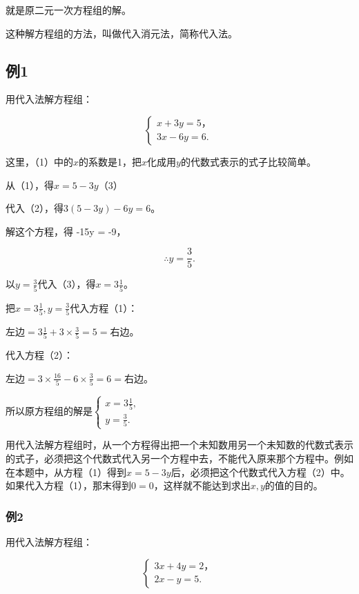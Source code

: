 就是原二元一次方程组的解。

这种解方程组的方法，叫做代入消元法，简称代入法。

\subsection{例1}

用代入法解方程组：

\[
\left\{ \begin{array}{l} x + 3 y = 5\text{，} \\ 3 x - 6 y = 6. \end{array} \right. \tag{1}
\]

这里，（1）中的\(x\)的系数是1，把\(x\)化成用\(y\)的代数式表示的式子比较简单。

 从（1），得\(x = 5 - 3y\)（3）

代入（2），得\(3(5 - 3y) - 6y = 6\)。

解这个方程，得 -15y = -9，

\[
\therefore y = \frac{3}{5}.
\]

以\(y = \frac{3}{5}\)代入（3），得\(x = 3\frac{1}{5}\)。

 把\(x = 3\frac{1}{5}, y = \frac{3}{5}\)代入方程（1）：

左边\(= 3\frac{1}{5} + 3 \times \frac{3}{5} = 5 =\)右边。

代入方程（2）：

左边\(= 3 \times \frac{16}{5} - 6 \times \frac{3}{5} = 6 =\)右边。

所以原方程组的解是\(\left\{ \begin{array}{l} x = 3\frac{1}{5}, \\ y = \frac{3}{5}. \end{array} \right.\)

用代入法解方程组时，从一个方程得出把一个未知数用另一个未知数的代数式表示的式子，必须把这个代数式代入另一个方程中去，不能代入原来那个方程中。例如在本题中，从方程（1）得到\(x = 5 - 3y\)后，必须把这个代数式代入方程（2）中。如果代入方程（1），那末得到\(0 = 0\)，这样就不能达到求出\(x, y\)的值的目的。

\subsubsection{例2}

用代入法解方程组：

\[
\left\{ \begin{array}{l} 3 x + 4 y = 2\text{，} \\ 2 x - y = 5. \end{array} \right. \tag{1}
\]


